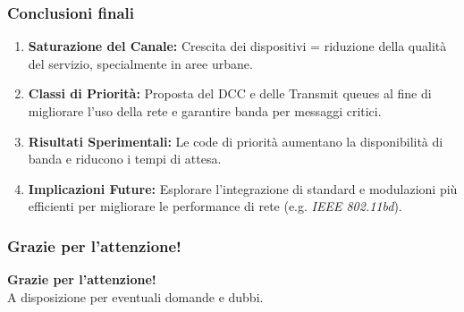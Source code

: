 \documentclass[aspectratio=169]{beamer}
\begin{document}
\begin{frame}
    \frametitle{Conclusioni finali}

    \begin{enumerate}
        \vspace{5pt}
        \item \textbf{Saturazione del Canale:} Crescita dei dispositivi = riduzione della qualità del servizio, specialmente in aree urbane.
        \vspace{5pt}
        \item \textbf{Classi di Priorità:} Proposta del DCC e delle Transmit queues al fine di migliorare l'uso della rete e garantire banda per messaggi critici.
        \vspace{5pt}
        \item \textbf{Risultati Sperimentali:} Le code di priorità aumentano la disponibilità di banda e riducono i tempi di attesa.
        \vspace{5pt}
        \item \textbf{Implicazioni Future:} Esplorare l'integrazione di standard e modulazioni più efficienti per migliorare le performance di rete (e.g. \textit{IEEE 802.11bd}).
        \vspace{5pt}
    \end{enumerate}

\end{frame}

\begin{frame}
    \frametitle{Grazie per l'attenzione!}

    \begin{center}
        \textbf{Grazie per l'attenzione!} \\[1em]
        A disposizione per eventuali domande e dubbi.
    \end{center}

\end{frame}
\end{document}
